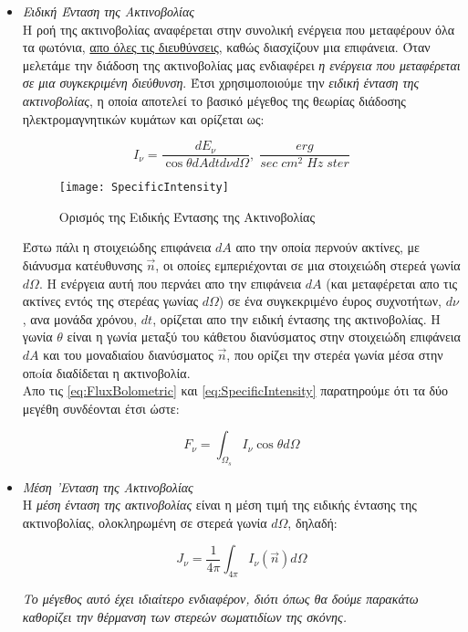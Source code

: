 \begin{itemize}
\item {\it Ειδική Ένταση της Ακτινοβολίας}\\

Η ροή της ακτινοβολίας αναφέρεται στην συνολική ενέργεια που μεταφέρουν όλα τα φωτόνια, \underline{απο όλες τις διευθύνσεις}, καθώς διασχίζουν μια επιφάνεια. Όταν μελετάμε την διάδοση της ακτινοβολίας μας ενδιαφέρει {\it η ενέργεια που μεταφέρεται σε μια συγκεκριμένη διεύθυνση}. Έτσι χρησιμοποιούμε την {\it ειδική ένταση της ακτινοβολίας}, η οποία αποτελεί το βασικό μέγεθος της θεωρίας διάδοσης ηλεκτρομαγνητικών κυμάτων και ορίζεται ως: 

\begin{equation}\label{eq:SpecificIntensity}
  I_{\nu}=\frac{dE_{\nu}}{\cos{\theta} dAdtd\nu d\Omega} , \; \frac{erg}{sec \; cm^2 \; Hz \; ster}
\end{equation}

\begin{figure}[h]
\en
  \centering
  \texttt{[image: SpecificIntensity]}
  \gr
  \caption{Ορισμός της Ειδικής Έντασης της Ακτινοβολίας}\label{fig:SpecificIntensity}
\end{figure}


Έστω πάλι η στοιχειώδης επιφάνεια $dA$ απο την οποία περνούν ακτίνες, με διάνυσμα κατέυθυνσης $\vec{n}$, οι οποίες εμπεριέχονται σε μια στοιχειώδη στερεά γωνία $d\Omega$. Η ενέργεια αυτή που περνάει απο την επιφάνεια $dA$ (και μεταφέρεται απο τις ακτίνες εντός της στερέας γωνίας $d\Omega$) σε ένα συγκεκριμένο έυρος συχνοτήτων, $d\nu$, ανα μονάδα χρόνου, $dt$, ορίζεται απο την ειδική έντασης της ακτινοβολίας. Η γωνία $\theta$ είναι η γωνία μεταξύ του κάθετου διανύσματος στην στοιχειώδη επιφάνεια ${dA}$ και του μοναδιαίου διανύσματος $\vec{n}$, που ορίζει την στερέα γωνία μέσα στην οπoία διαδίδεται η ακτινοβολία.\\

Απο τις \eqref{eq:FluxBolometric} και \eqref{eq:SpecificIntensity} παρατηρούμε ότι τα δύο μεγέθη συνδέονται έτσι ώστε:

\begin{equation}\label{eq:FluxBolSpecInte}
  {F_{\nu}} = \int_{\Omega_s} I_{\nu}\cos{\theta} d\Omega  
\end{equation}

\item {\it Μέση 'Ενταση της Ακτινοβολίας}\\

Η {\it μέση ένταση της ακτινοβολίας} είναι η μέση τιμή της ειδικής έντασης της ακτινοβολίας, ολοκληρωμένη σε στερεά γωνία $d\Omega$, δηλαδή:

\begin{equation}\label{eq:MeanIntensity}
  J_{\nu} = \frac{1}{4\pi} \int_{4\pi} I_{\nu}(\vec{n}) d\Omega  
\end{equation}

{\it Το μέγεθος αυτό έχει ιδιαίτερο ενδιαφέρον, διότι όπως θα δούμε παρακάτω  καθορίζει την θέρμανση των στερεών σωματιδίων της σκόνης.}
 \end{itemize}
 

